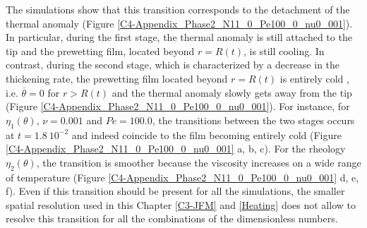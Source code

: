The  simulations   show  that  this  transition   corresponds  to  the
detachment       of       the      thermal       anomaly       (Figure
\ref{C4-Appendix_Phase2_N11_0_Pe100_0_nu0_001}).     In    particular,
during the first  stage, the thermal anomaly is still  attached to the
tip  and  the  prewetting  film, located  beyond  $r=R(t)$,  is  still
cooling.  In contrast, during the second stage, which is characterized
by  a decrease  in the  thickening rate,  the prewetting  film located
beyond $r=R(t)$  is entirely cold  , i.e.  $\overline{\theta}  =0$ for
$r>R(t)$ and the thermal anomaly slowly gets away from the tip (Figure
\ref{C4-Appendix_Phase2_N11_0_Pe100_0_nu0_001}).   For  instance,  for
$\eta_1(\theta)$, $\nu=0.001$ and  $Pe=100.0$, the transitions between
the two  stages occurs at  $t=1.8~10^{-2}$ and indeed coincide  to the
film          becoming          entirely         cold          (Figure
\ref{C4-Appendix_Phase2_N11_0_Pe100_0_nu0_001}  a,  b,  c).   For  the
rheology  $\eta_2(\theta)$, the  transition  is  smoother because  the
viscosity   increases  on   a  wide   range  of   temperature  (Figure
\ref{C4-Appendix_Phase2_N11_0_Pe100_0_nu0_001} d, e,  f). Even if this
transition  should be  present for  all the  simulations, the  smaller
spatial resolution used in this Chapter \ref{C3-JFM} and \ref{Heating}
does not allow to resolve this  transition for all the combinations of
the dimensionless numbers.

